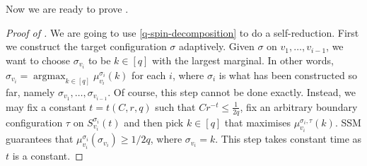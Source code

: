 \documentclass[11pt,a4paper]{amsart}
\theoremstyle{definition}
\theoremstyle{remark}
\newcommand{\argmax}{\operatorname{argmax}}
\begin{document}
Now we are ready to prove . 

\begin{proof}[Proof of ]
  We are going to use \eqref{q-spin-decomposition} to do a self-reduction.
  First we construct the target configuration $\sigma$ adaptively.
  Given $\sigma$ on $v_1,\ldots,v_{i-1}$,
  we want to choose $\sigma_{v_i}$ to be $k\in [q]$ with the largest marginal.
  In other words, $\sigma_{v_i}=\argmax_{k\in[q]}\mu_{v_i}^{\sigma_i}(k)$ for each $i$,
  where $\sigma_i$ is what has been constructed so far, namely $\sigma_{v_1},\ldots,\sigma_{v_{i-1}}$.
  Of course, this step cannot be done exactly.
  Instead, we may fix a constant $t = t(C,r,q)$ such that $Cr^{-t} \leq \frac{1}{2q}$, fix an arbitrary boundary  configuration $\tau$ on $S^{\sigma_i}_{v_i}(t)$ and then pick $k\in[q]$ that maximises $\mu^{\sigma_i,\tau}_{v_i}(k)$.
  SSM guarantees that
  $\mu_{v_i}^{\sigma_i}(\sigma_{v_i})\ge 1/2q$, where $\sigma_{v_i} = k$.
  This step takes constant time as $t$ is a constant.


\end{proof}
\end{document}
